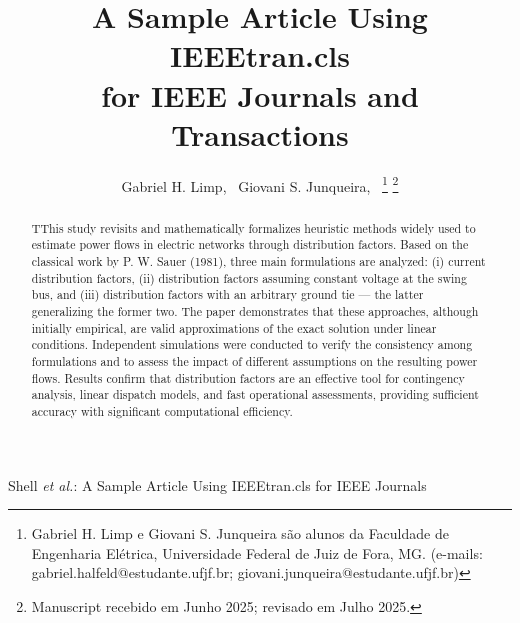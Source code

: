 \documentclass[journal]{IEEEtran}
\begin{document}
\title{A Sample Article Using IEEEtran.cls\\ for IEEE Journals and Transactions}

\author{Gabriel H. Limp,~
        Giovani S. Junqueira,~%
        \thanks{Gabriel H. Limp e Giovani S. Junqueira são alunos da Faculdade de Engenharia El\'etrica, Universidade Federal de Juiz de Fora, MG. (e-mails: gabriel.halfeld@estudante.ufjf.br; giovani.junqueira@estudante.ufjf.br)}%
        \thanks{Manuscript recebido em Junho 2025; revisado em Julho 2025.}
}

%
{Shell \MakeLowercase{\textit{et al.}}: A Sample Article Using IEEEtran.cls for IEEE Journals}


\maketitle

\begin{abstract}
TThis study revisits and mathematically formalizes heuristic methods widely used to estimate power flows in electric networks through distribution factors. Based on the classical work by P. W. Sauer (1981), three main formulations are analyzed: (i) current distribution factors, (ii) distribution factors assuming constant voltage at the swing bus, and (iii) distribution factors with an arbitrary ground tie — the latter generalizing the former two. The paper demonstrates that these approaches, although initially empirical, are valid approximations of the exact solution under linear conditions. Independent simulations were conducted to verify the consistency among formulations and to assess the impact of different assumptions on the resulting power flows. Results confirm that distribution factors are an effective tool for contingency analysis, linear dispatch models, and fast operational assessments, providing sufficient accuracy with significant computational efficiency. 
\end{abstract}
\end{document}
